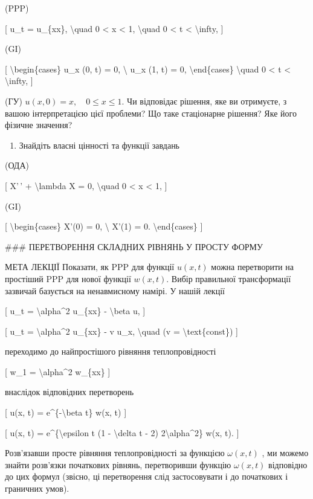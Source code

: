 \documentclass[
]{article}
\providecommand{\tightlist}{%
  \setlength{\itemsep}{0pt}\setlength{\parskip}{0pt}}
\begin{document}
(PPP)

{[} u\_t = u\_\{xx\}, \textbackslash quad 0 \textless{} x \textless{} 1,
\textbackslash quad 0 \textless{} t \textless{} \textbackslash infty,
{]}

(GI)

{[} \textbackslash begin\{cases\} u\_x (0, t) = 0, \textbackslash{} u\_x
(1, t) = 0, \textbackslash end\{cases\} \textbackslash quad 0
\textless{} t \textless{} \textbackslash infty, {]}

(ГУ) \(u(x, 0) = x, \quad 0 \le x \le 1.\) Чи відповідає рішення, яке ви
отримуєте, з вашою інтерпретацією цієї проблеми? Що таке стаціонарне
рішення? Яке його фізичне значення?

\begin{enumerate}
\def\labelenumi{\arabic{enumi}.}
\setcounter{enumi}{3}
\tightlist
\item
  Знайдіть власні цінності та функції завдань
\end{enumerate}

(ОДА)

{[} X'\,' + \textbackslash lambda X = 0, \textbackslash quad 0
\textless{} x \textless{} 1, {]}

(GI)

{[} \textbackslash begin\{cases\} X'(0) = 0, \textbackslash{} X'(1) = 0.
\textbackslash end\{cases\} {]}

\#\#\# ПЕРЕТВОРЕННЯ СКЛАДНИХ РІВНЯНЬ У ПРОСТУ ФОРМУ

МЕТА ЛЕКЦІЇ Показати, як PPP для функції \(u(x, t)\) можна перетворити
на простіший PPP для нової функції \(w(x, t)\). Вибір правильної
трансформації зазвичай базується на ненавмисному намірі. У нашій лекції

{[} u\_t = \textbackslash alpha\^{}2 u\_\{xx\} - \textbackslash beta u,
{]}

{[} u\_t = \textbackslash alpha\^{}2 u\_\{xx\} - v u\_x,
\textbackslash quad (v = \textbackslash text\{const\}) {]}

переходимо до найпростішого рівняння теплопровідності

{[} w\_1 = \textbackslash alpha\^{}2 w\_\{xx\} {]}

внаслідок відповідних перетворень

{[} u(x, t) = e\^{}\{-\textbackslash beta t\} w(x, t) {]}

{[} u(x, t) = e\^{}\{\textbackslash epsilon t (1 - \textbackslash delta
t - 2) 2\textbackslash alpha\^{}2\} w(x, t). {]}

Розв'язавши просте рівняння теплопровідності за функцією \(\omega(x,t)\)
, ми можемо знайти розв'язки початкових рівнянь, перетворивши функцію
\(\omega(x,t)\) відповідно до цих формул (звісно, ці перетворення слід
застосовувати і до початкових і граничних умов).
\end{document}
